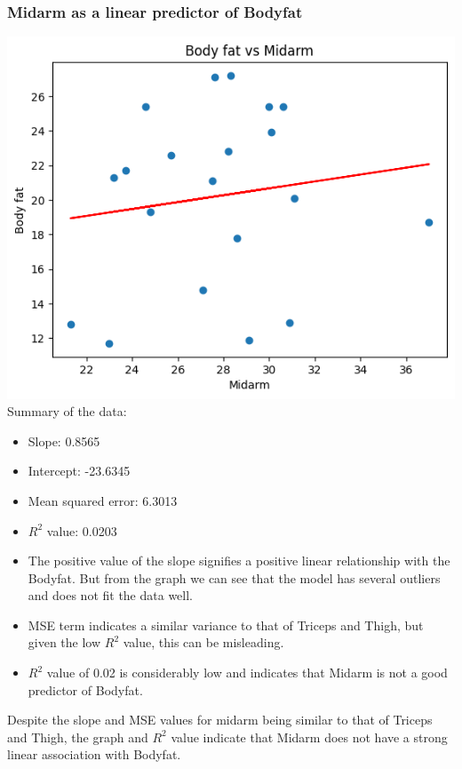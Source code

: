 \documentclass[12pt]{article}
\begin{document}
\subsubsection*{Midarm as a linear predictor of Bodyfat}
\includegraphics*[width=\linewidth]{graph4b3}
Summary of the data:
\begin{itemize}
    \item Slope: 0.8565
    \item Intercept: -23.6345
    \item Mean squared error: 6.3013
    \item \(R^2\) value: 0.0203
    \item The positive value of the slope signifies a positive linear relationship
    with the Bodyfat. But from the graph we can see that the model has several
    outliers and does not fit the data well.
    \item MSE term indicates a similar variance to that of Triceps and Thigh, but
    given the low \(R^2\) value, this can be misleading.
    \item \(R^2\) value of 0.02 is considerably low and indicates that Midarm is
    not a good predictor of Bodyfat.
\end{itemize}
Despite the slope and MSE values for midarm being similar to that of Triceps and
Thigh, the graph and \(R^2\) value indicate that Midarm does not have a strong
linear association with Bodyfat.

\newpage
\end{document}
